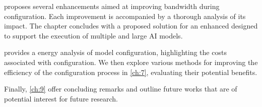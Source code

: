  proposes several \confignoc{} enhancements aimed at improving bandwidth during configuration.
Each improvement is accompanied by a thorough analysis of its impact.
The chapter concludes with a proposed solution for an enhanced \confignoc{} designed to support the execution of multiple and large AI models.

 provides a energy analysis of model configuration, highlighting the costs associated with configuration. 
We then explore various methods for improving the efficiency of the configuration process in \cref{ch:7}, evaluating their potential benefits.


Finally, \cref{ch:9} offer concluding remarks and outline future works that are of potential interest for future research.




